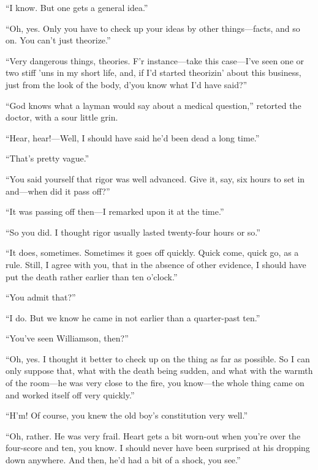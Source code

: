 \enquote{I know. But one gets a general idea.}

\enquote{Oh, yes. Only you have to check up your ideas by other things\allowbreak---\allowbreak facts, and so on. You can't just theorize.}

\enquote{Very dangerous things, theories. F'r instance\allowbreak---\allowbreak take this case\allowbreak---\allowbreak I've seen one or two stiff 'uns in my short life, and, if I'd started theorizin' about this business, just from the look of the body, d'you know what I'd have said?}

\enquote{God knows what a layman would say about a medical question,} retorted the doctor, with a sour little grin.

\enquote{Hear, hear!---Well, I should have said he'd been dead a long time.}

\enquote{That's pretty vague.}

\enquote{You said yourself that rigor was well advanced. Give it, say, six hours to set in and\allowbreak---\allowbreak when did it pass off?}

\enquote{It was passing off then\allowbreak---\allowbreak I remarked upon it at the time.}

\enquote{So you did. I thought rigor usually lasted twenty-four hours or so.}

\enquote{It does, sometimes. Sometimes it goes off quickly. Quick come, quick go, as a rule. Still, I agree with you, that in the absence of other evidence, I should have put the death rather earlier than ten o'clock.}

\enquote{You admit that?}

\enquote{I do. But we know he came in not earlier than a quarter-past ten.}

\enquote{You've seen Williamson, then?}

\enquote{Oh, yes. I thought it better to check up on the thing as far as possible. So I can only suppose that, what with the death being sudden, and what with the warmth of the room\allowbreak---\allowbreak he was very close to the fire, you know\allowbreak---\allowbreak the whole thing came on and worked itself off very quickly.}

\enquote{H'm! Of course, you knew the old boy's constitution very well.}

\enquote{Oh, rather. He was very frail. Heart gets a bit worn-out when you're over the four-score and ten, you know. I should never have been surprised at his dropping down anywhere. And then, he'd had a bit of a shock, you see.}

